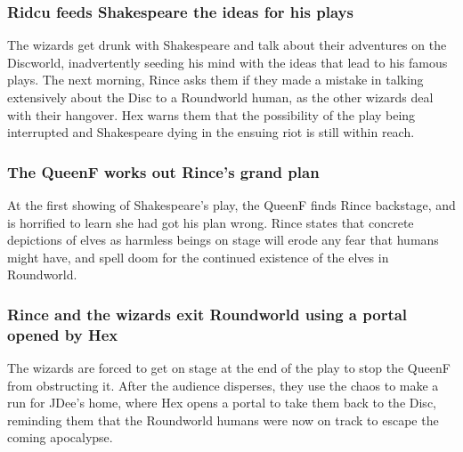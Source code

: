 \subsubsection{\Gls{Ridcu} feeds Shakespeare the ideas for his plays}
The wizards get drunk with Shakespeare and talk about their adventures on the Discworld,
inadvertently seeding his mind with the ideas that lead to his famous plays. The next morning,
\Gls{Rince} asks them if they made a mistake in talking extensively about the Disc to a Roundworld
human, as the other wizards deal with their hangover. \Gls{Hex} warns them that the possibility of
the play being interrupted and Shakespeare dying in the ensuing riot is still within reach.

\subsubsection{The \Gls{QueenF} works out \Gls{Rince}'s grand plan}
At the first showing of Shakespeare's play, the \Gls{QueenF} finds \Gls{Rince} backstage, and is
horrified to learn she had got his plan wrong. \Gls{Rince} states that concrete depictions of elves
as harmless beings on stage will erode any fear that humans might have, and spell doom for the
continued existence of the elves in Roundworld.

\subsubsection{\Gls{Rince} and the wizards exit Roundworld using a portal opened by \Gls{Hex}}
The wizards are forced to get on stage at the end of the play to stop the \Gls{QueenF} from
obstructing it. After the audience disperses, they use the chaos to make a run for \Gls{JDee}'s
home, where \Gls{Hex} opens a portal to take them back to the Disc, reminding them that the
Roundworld humans were now on track to escape the coming apocalypse.